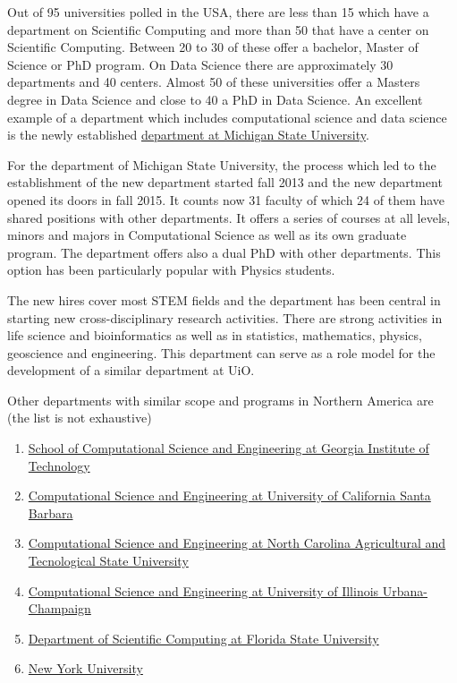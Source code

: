 \documentclass[%
oneside,                 %
final,                   %
10pt]{article}
\begin{document}
Out of 95 universities polled in the USA, there are less than 15 which have a department on Scientific Computing
and more than 50 that have a center on Scientific Computing. Between 20 to 30 of these offer a bachelor, Master of Science or PhD program. On Data Science there are approximately 30 departments and 40 centers. Almost 50 of these universities offer a Masters degree in Data Science and close to 40 a PhD in Data Science. 
An excellent example of a department which includes computational science and data science is the newly established \href{{https://cmse.msu.edu/}}{department at Michigan State University}.

For the department of Michigan State University, the process which led to the establishment of the new department started fall 2013 and the new department opened its doors in fall 2015. It counts now 31 faculty of which 24 of them have shared positions with other departments. It offers a series of courses at all levels, minors and majors in Computational Science as well as its own graduate program. The department offers also a dual PhD with other departments. This option has been particularly popular with Physics students.

The new hires cover most STEM fields and the department has been central in starting new cross-disciplinary research activities. There are strong activities in life science and bioinformatics as well as in statistics, mathematics, physics, geoscience  and engineering. This department can serve as a role model for the development of a similar department at UiO. 

Other departments with similar scope and programs  in Northern America are (the list is not exhaustive)
\begin{enumerate}
\item \href{{https://www.cse.gatech.edu/}}{School of Computational Science and Engineering at Georgia Institute of Technology}

\item \href{{https://cse.ucsb.edu/}}{Computational Science and Engineering at University of California Santa Barbara}

\item \href{{http://www.ncat.edu/coe/departments/cse/index.html}}{Computational Science and Engineering at North Carolina Agricultural and Tecnological State University}

\item \href{{https://cse.illinois.edu/}}{Computational Science and Engineering at University of Illinois Urbana-Champaign}

\item \href{{https://www.sc.fsu.edu/}}{Department of Scientific Computing at Florida State University}

\item \href{{https://datascience.nyu.edu}}{New York University} 
\end{enumerate}
\end{document}
